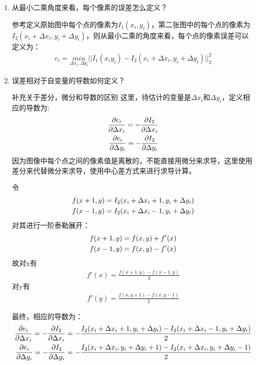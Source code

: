 \documentclass[40pt,a4paper，UTF8]{ctexart}
\numberwithin{equation}{section}
\begin{document}
\begin{enumerate}
\item 从最小二乘角度来看，每个像素的误差怎么定义？

参考\cite{ref2}定义原始图中每个点的像素为$I_1(x_i,y_i)$，第二张图中的每个点的像素为$I_2(x_i+\Delta x_i,y_i+\Delta y_i)$，则从最小二乘的角度来看，每个点的像素误差可以定义为：
\begin{align}
e_i=\underset{\Delta x_i,\Delta y_i}{min}||I_1(x_iy_i)-I_2(x_i+\Delta x_i,y_i+\Delta y_i)||_2^2
\end{align}


\item 误差相对于自变量的导数如何定义？

补充关于差分，微分和导数的区别\cite{ref1}
这里，待估计的变量是$\Delta x_i$和$\Delta y_i$，定义相应的导数为:
\begin{align}
\frac{\partial e_i}{\partial \Delta x_i}=-\frac{\partial I_2}{\partial \Delta x_i} \notag \\
\frac{\partial e_i}{\partial \Delta y_i}=-\frac{\partial I_2}{\partial \Delta y_i}
\end{align}
因为图像中每个点之间的像素值是离散的，不能直接用微分来求导，这里使用差分来代替微分来求导，使用中心差方式来进行求导计算。

令
\begin{align}
f(x+1,y)=I_2(x_i+\Delta x_i+1,y_i+\Delta y_i) \notag \\
f(x-1,y)=I_2(x_i+\Delta x_i-1,y_i+\Delta y_i) 
\end{align}
对其进行一阶泰勒展开：
\begin{align}
f(x+1,y)=f(x,y)+f'(x)  \notag \\
f(x-1,y)=f(x,y)-f'(x)
\end{align}
故对x有 
\begin{align}
f'(x)=\frac{f(x+1,y)-f(x-1,y)}{2}
\end{align}
对y有
\begin{align}
f'(y)=\frac{f(x,y+1)-f(x,y-1)}{2}
\end{align}

最终，相应的导数为：
\begin{align}
\frac{\partial e_i}{\partial \Delta x_i}=-\frac{\partial I_2}{\partial \Delta x_i}
=-\frac{I_2(x_i+\Delta x_i+1,y_i+\Delta y_i)-I_2(x_i+\Delta x_i-1,y_i+\Delta y_i)}{2}  \notag \\
\frac{\partial e_i}{\partial \Delta y_i}=-\frac{\partial I_2}{\partial \Delta y_i}
=-\frac{I_2(x_i+\Delta x_i,y_i+\Delta y_i+1)-I_2(x_i+\Delta x_i,y_i+\Delta y_i-1)}{2}
\end{align}
\end{enumerate}
\end{document}
